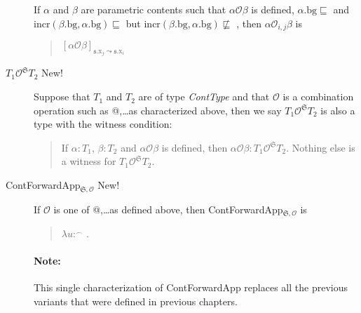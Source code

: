\begin{description}
If
$\alpha$ and $\beta$ are parametric contents such that
$\alpha\mathcal{O}\beta$ is defined, $\alpha.\text{bg}\sqsubseteq$
and $\mathrm{incr}(\beta.\text{bg},\alpha.\text{bg})\sqsubseteq$
but $\mathrm{incr}(\beta.\text{bg},\alpha.\text{bg})\not\sqsubseteq$
,
then $\alpha\mathcal{O}_{i,j}\beta$ is
\begin{quote}
  $[\alpha\mathcal{O}\beta]_{\mathfrak{s}.\text{x}_j\leadsto\mathfrak{s}.\text{x}_i}$
\end{quote}


      
    \item[\textnormal{$T_1\mathcal{O}^{\mathfrak{S}}T_2$} New!]
      \mbox{}

      Suppose that $T_1$ and
$T_2$ are of type \textit{ContType} and that $\mathcal{O}$ is a combination
operation such as @,\ldots as characterized above, then we say $T_1\mathcal{O}^{\mathfrak{S}}T_2$
is also a type with the witness condition:
\begin{quote} 
If $\alpha:T_1$, $\beta:T_2$ and $\alpha\mathcal{O}\beta$ is defined,
then $\alpha\mathcal{O}\beta:T_1\mathcal{O}^{\mathfrak{S}}T_2$.
Nothing else is a witness for $T_1\mathcal{O}^{\mathfrak{S}}T_2$. 
\end{quote} 


    
    
\item[\textnormal{ContForwardApp$_{\mathfrak{S},\mathcal{O}}$} New!]
  \mbox{}

  If $\mathcal{O}$ is one of @,\ldots as defined above, then
ContForwardApp$_{\mathfrak{S},\mathcal{O}}$ is
\begin{quote}
  $\lambda u$:$^\frown$ . 
\end{quote}

\paragraph{Note:}  This single characterization of ContForwardApp
replaces all the previous variants that were defined in previous chapters.


\end{description}
